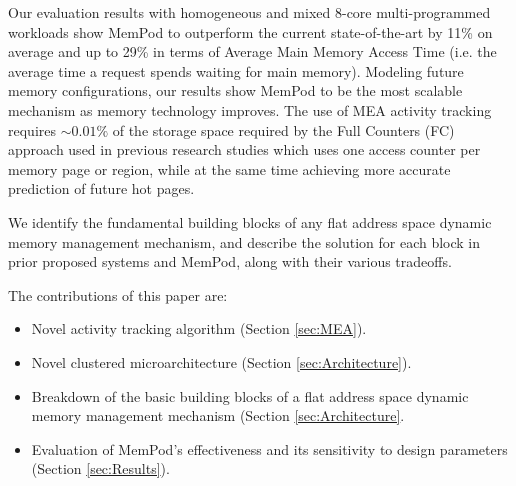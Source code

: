 Our evaluation results with homogeneous and mixed 8-core multi-programmed workloads show MemPod to outperform the current state-of-the-art by 11\% on average and up to 29\% in terms of Average Main Memory Access Time (i.e. the average time a request spends waiting for main memory). Modeling future memory configurations, our results show MemPod to be the most scalable mechanism as memory technology improves. The use of MEA activity tracking requires $\sim0.01\%$ of the storage space required by the Full Counters (FC) approach used in previous research studies which uses one access counter per memory page or region, while at the same time achieving more accurate prediction
of future hot pages.


We identify the fundamental building blocks of any flat address space dynamic 
memory management mechanism, and describe the solution for each block in 
prior proposed systems and MemPod, along with their various tradeoffs. 


The contributions of this paper are:

\begin{itemize}
\item Novel activity tracking algorithm (Section \ref{sec:MEA}).
\item Novel clustered microarchitecture (Section \ref{sec:Architecture}).
\item Breakdown of the basic building blocks of a flat address space dynamic memory management mechanism (Section \ref{sec:Architecture}.
\item Evaluation of MemPod's effectiveness and its sensitivity to design parameters (Section \ref{sec:Results}).
\end{itemize}

